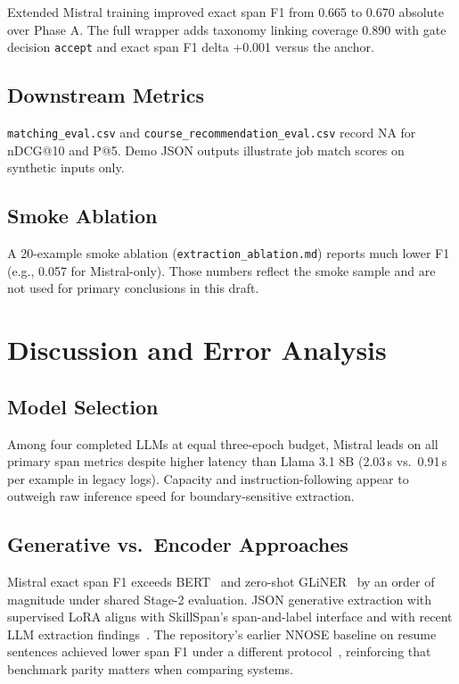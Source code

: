\documentclass[12pt,oneside]{report}
\begin{document}
Extended Mistral training improved exact span F1 from 0.665 to 0.670 absolute over Phase A.
The full wrapper adds taxonomy linking coverage 0.890 with gate decision \texttt{accept} and exact span F1 delta +0.001 versus the anchor.

\section{Downstream Metrics}

\texttt{matching\_eval.csv} and \texttt{course\_recommendation\_eval.csv} record NA for nDCG@10 and P@5.
Demo JSON outputs illustrate job match scores on synthetic inputs only.

\section{Smoke Ablation}

A 20-example smoke ablation (\texttt{extraction\_ablation.md}) reports much lower F1 (e.g., 0.057 for Mistral-only).
Those numbers reflect the smoke sample and are not used for primary conclusions in this draft.

\chapter{Discussion and Error Analysis}
\label{ch:discuss}

\section{Model Selection}

Among four completed LLMs at equal three-epoch budget, Mistral leads on all primary span metrics despite higher latency than Llama 3.1 8B (2.03\,s vs.\ 0.91\,s per example in legacy logs).
Capacity and instruction-following appear to outweigh raw inference speed for boundary-sensitive extraction.

\section{Generative vs.\ Encoder Approaches}

Mistral exact span F1 exceeds BERT~\cite{devlin2019bert} and zero-shot GLiNER~\cite{zaratiana2023gliner} by an order of magnitude under shared Stage-2 evaluation.
JSON generative extraction with supervised LoRA aligns with SkillSpan's span-and-label interface and with recent LLM extraction findings~\cite{nguyen2024rethinking,herandi2024skillllm}.
The repository's earlier NNOSE baseline on resume sentences achieved lower span F1 under a different protocol~\cite{zhang2024nnose}, reinforcing that benchmark parity matters when comparing systems.
\end{document}
